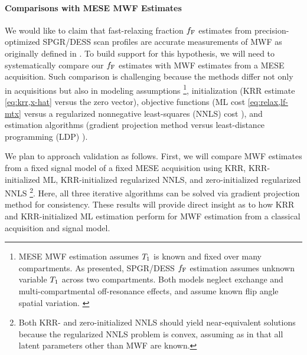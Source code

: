 \paragraph{Comparisons with MESE MWF Estimates}
We would like to claim
that fast-relaxing fraction $f_{\mathrm{F}}$ estimates
from precision-optimized SPGR/DESS scan profiles
are accurate measurements 
of MWF as originally defined 
in \cite{mackay:94:ivv}.
To build support
for this hypothesis,
we will need
to systematically compare our $f_{\mathrm{F}}$ estimates
with MWF estimates
from a MESE acquisition.
Such comparison is challenging
because the methods differ
not only in acquisitions
but also in modeling assumptions
\footnote{MESE MWF estimation 
	assumes $T_1$ is known and fixed
	over many compartments.
	As presented, SPGR/DESS $f_{\mathrm{F}}$ estimation
	assumes unknown variable $T_1$
	across two compartments.
	Both models neglect exchange 
	and multi-compartmental off-resonance effects,
	and assume known flip angle spatial variation.
	\label{foot:mwf,assumption}
},
initialization
(KRR estimate \eqref{eq:krr,x-hat}
versus the zero vector),
objective functions
(ML cost \eqref{eq:relax,lf-mtx}
versus a regularized nonnegative least-squares (NNLS) cost
\cite[Eq.~8]{whittall:89:qio}),
and estimation algorithms
(gradient projection method \cite{rosen:60:tgp}
versus
least-distance programming (LDP) \cite[\S23.4]{lawson:74}).

We plan to approach validation as follows.
First,
we will compare \invivo MWF estimates
from a fixed signal model
of a fixed MESE acquisition
using KRR, KRR-initialized ML,
KRR-initialized regularized NNLS,
and zero-initialized regularized NNLS
\footnote{Both KRR- and zero-initialized NNLS 
	should yield near-equivalent solutions
	because the regularized NNLS problem is convex,
	assuming as in \cite{whittall:89:qio, mackay:94:ivv}
	that all latent parameters other than MWF are known.
}.
Here, 
all three iterative algorithms can be solved
via gradient projection method
for consistency.
These results will provide direct insight
as to how KRR and KRR-initialized ML estimation perform
for \invivo MWF estimation
from a classical acquisition and signal model.

